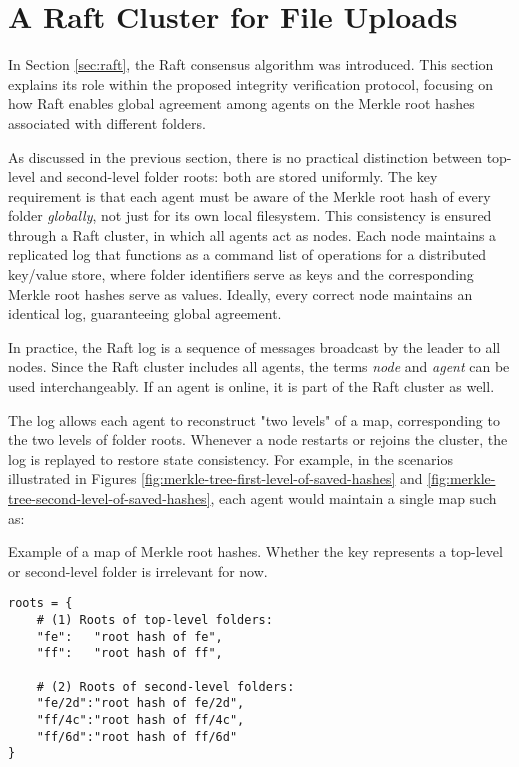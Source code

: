 \section{A Raft Cluster for File Uploads} \label{sec:raft-cluster-for-file-uploads}

In Section \ref{sec:raft}, the Raft consensus algorithm was introduced. This
section explains its role within the proposed integrity verification protocol, focusing on how Raft enables global agreement among agents on the Merkle root hashes associated with different folders.

As discussed in the previous section, there is no practical distinction between top-level and second-level folder roots: both are stored uniformly. The key requirement is that each agent must be aware of the Merkle root hash of every folder \emph{globally}, not just for its own local filesystem. This consistency is ensured through a Raft cluster, in which all agents act as nodes. Each node maintains a replicated log that functions as a command list of operations for a distributed key/value store, where folder identifiers serve as keys and the corresponding Merkle root hashes serve as values. Ideally, every correct node maintains an identical log, guaranteeing global agreement.

In practice, the Raft log is a sequence of messages broadcast by the leader to all nodes. Since the Raft cluster includes all agents, the terms \emph{node} and \emph{agent} can be used interchangeably. If an agent is online, it is part of the Raft cluster as well.

The log allows each agent to reconstruct "two levels" of a map, corresponding to the two levels of folder roots. Whenever a node restarts or rejoins the cluster, the log is replayed to restore state consistency. For example, in the scenarios illustrated in Figures \ref{fig:merkle-tree-first-level-of-saved-hashes} and \ref{fig:merkle-tree-second-level-of-saved-hashes}, each agent would maintain a single map such as:

\begin{listing}[H]
\caption{Example of a map of Merkle root hashes. Whether the key represents a top-level or second-level folder is irrelevant for now.}
\label{code:map-of-roots}
\begin{verbatim}
roots = {
    # (1) Roots of top-level folders:
    "fe":   "root hash of fe",
    "ff":   "root hash of ff",
    
    # (2) Roots of second-level folders:
    "fe/2d":"root hash of fe/2d",
    "ff/4c":"root hash of ff/4c",
    "ff/6d":"root hash of ff/6d"
}
\end{verbatim}
\end{listing}

